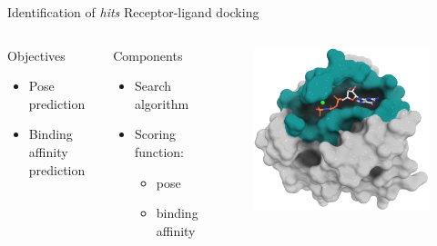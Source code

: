 \documentclass[aspectratio=169,xcolor=dvipsnames]{beamer}
\begin{document}
\begin{frame}{Identification of \textit{hits} \hfill Receptor-ligand docking}
    \begin{columns}[c]
        \begin{block}{Objectives}
            \begin{itemize}
                \item Pose prediction
                \item Binding affinity prediction
            \end{itemize}
        \end{block}

        \begin{block}{Components}
            \begin{itemize}
                \item Search algorithm
                \item Scoring function:
                      \begin{itemize}
                          \item pose
                          \item binding affinity
                      \end{itemize}
            \end{itemize}

        \end{block}

        \begin{figure}
            \centering
            \includegraphics[width=.8\linewidth]{imgs/docking.png}
        \end{figure}

    \end{columns}
\end{frame}
\end{document}
